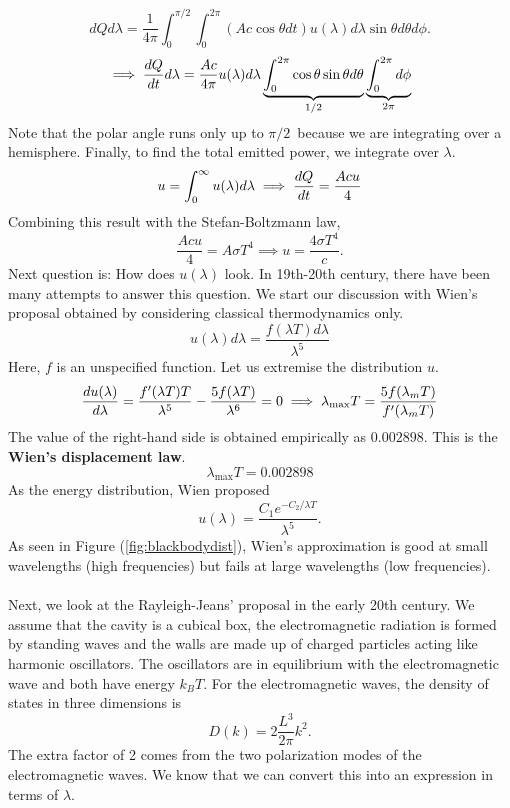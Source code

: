 \begin{equation}
    dQ d\lambda = \frac{1}{4\pi}\int_0^{\pi/2}\int_{0}^{2\pi}(Ac\cos\theta dt)u(\lambda)d\lambda \sin\theta d\theta d\phi.     
\end{equation}
\begin{equation}
    \implies \frac{d Q}{d t}d\lambda = \frac{Ac}{4\pi}u(\lambda)d\lambda\underbrace{\int_{0}^{2\pi}\cos\theta\sin\theta d\theta}_{1/2}\underbrace{\int_{0}^{2\pi}d\phi}_{2\pi} 
\end{equation}
Note that the polar angle runs only up to $\pi/2$ because we are integrating over a hemisphere. Finally, to find the total emitted power, we integrate over $\lambda$. 
\begin{equation}
    u = \int_{0}^{\infty}u(\lambda)d\lambda \implies \frac{d Q}{d t} = \frac{Acu}{4}
\end{equation}
Combining this result with the Stefan-Boltzmann law,
\begin{equation}
    \frac{Acu}{4}=A\sigma T^4 \implies  u = \frac{4\sigma T^4}{c}.
\end{equation}
Next question is: How does $u(\lambda)$ look. In 19th-20th century, there have been many attempts to answer this question. We start our discussion with Wien's proposal obtained by considering classical thermodynamics only. 
\begin{equation}
    u(\lambda)d\lambda = \frac{f(\lambda T)d\lambda}{\lambda^5}
\end{equation}
Here, $f$ is an unspecified function. Let us extremise the distribution $u$. 
\begin{equation}
    \frac{d u(\lambda)}{d \lambda}=\frac{f'(\lambda T)T}{\lambda^5}-\frac{5f(\lambda T)}{\lambda^6} = 0 \implies \lambda_\mathrm{max}T = \frac{5f(\lambda_mT)}{f'(\lambda_mT)}
\end{equation}
The value of the right-hand side is obtained empirically as $0.002898$. This is the \textbf{Wien's displacement law}.
\begin{equation}
    \lambda_\mathrm{max}T = 0.002898
\end{equation}
As the energy distribution, Wien proposed
\begin{equation}
    u(\lambda) = \frac{C_1e^{-C_2/\lambda T}}{\lambda^5}.
\end{equation}
As seen in Figure (\ref{fig:blackbodydist}), Wien's approximation is good at small wavelengths (high frequencies) but fails at large wavelengths (low frequencies). \\
\\
Next, we look at the Rayleigh-Jeans' proposal in the early 20th century. We assume that the cavity is a cubical box, the electromagnetic radiation is formed by standing waves and the walls are made up of charged particles acting like harmonic oscillators. The oscillators are in equilibrium with the electromagnetic wave and both have energy $k_BT$. For the electromagnetic waves, the density of states in three dimensions is
\begin{equation}
    D(k)=2\frac{L^3}{2\pi}k^2.
\end{equation}
The extra factor of 2 comes from the two polarization modes of the electromagnetic waves. We know that we can convert this into an expression in terms of $\lambda$. 

